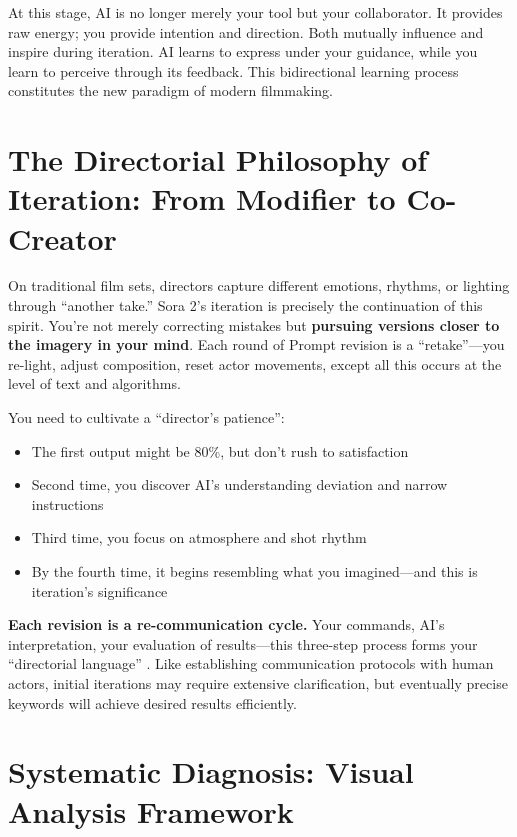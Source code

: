 At this stage, AI is no longer merely your tool but your collaborator. It provides raw energy; you provide intention and direction. Both mutually influence and inspire during iteration. AI learns to express under your guidance, while you learn to perceive through its feedback. This bidirectional learning process constitutes the new paradigm of modern filmmaking.

\section{The Directorial Philosophy of Iteration: From Modifier to Co-Creator}
\label{sec:iteration-philosophy}

On traditional film sets, directors capture different emotions, rhythms, or lighting through ``another take.'' Sora 2's iteration is precisely the continuation of this spirit. You're not merely correcting mistakes but \textbf{pursuing versions closer to the imagery in your mind}. Each round of Prompt revision is a ``retake''—you re-light, adjust composition, reset actor movements, except all this occurs at the level of text and algorithms.

You need to cultivate a ``director's patience'':

\begin{itemize}
\item The first output might be 80\%, but don't rush to satisfaction
\item Second time, you discover AI's understanding deviation and narrow instructions
\item Third time, you focus on atmosphere and shot rhythm
\item By the fourth time, it begins resembling what you imagined—and this is iteration's significance
\end{itemize}

\textbf{Each revision is a re-communication cycle.} Your commands, AI's interpretation, your evaluation of results—this three-step process forms your ``directorial language'' \citep{smith2012attentional}. Like establishing communication protocols with human actors, initial iterations may require extensive clarification, but eventually precise keywords will achieve desired results efficiently.

\section{Systematic Diagnosis: Visual Analysis Framework}
\label{sec:precise-diagnosis}

